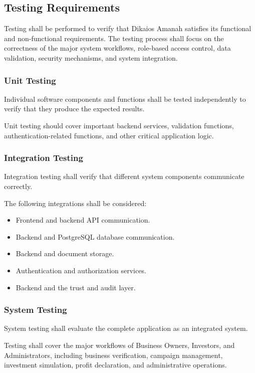 \subsection{Testing Requirements}

Testing shall be performed to verify that Dikaios Amanah satisfies its
functional and non-functional requirements. The testing process shall
focus on the correctness of the major system workflows, role-based
access control, data validation, security mechanisms, and system
integration.

\subsubsection{Unit Testing}

Individual software components and functions shall be tested
independently to verify that they produce the expected results.

Unit testing should cover important backend services, validation
functions, authentication-related functions, and other critical
application logic.

\subsubsection{Integration Testing}

Integration testing shall verify that different system components
communicate correctly.

The following integrations shall be considered:

\begin{itemize}
    \item Frontend and backend API communication.
    \item Backend and PostgreSQL database communication.
    \item Backend and document storage.
    \item Authentication and authorization services.
    \item Backend and the trust and audit layer.
\end{itemize}

\subsubsection{System Testing}

System testing shall evaluate the complete application as an integrated
system.

Testing shall cover the major workflows of Business Owners, Investors,
and Administrators, including business verification, campaign
management, investment simulation, profit declaration, and administrative
operations.

